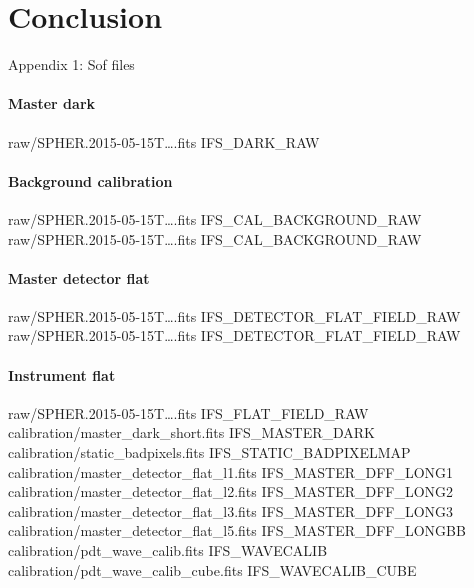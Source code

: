 \documentclass[twoside,single]{lion-msc}
\begin{document}
\chapter{Conclusion}





\clearpage
\huge{Appendix 1: Sof files}
\small
\subsubsection*{Master dark}
\begin{mdframed}[linewidth = 0.3mm, linecolor = black]
raw/SPHER.2015-05-15T\dots.fits IFS\_DARK\_RAW
\end{mdframed}

\subsubsection*{Background calibration}
\begin{mdframed}[linewidth = 0.3mm, linecolor = black]
raw/SPHER.2015-05-15T\dots.fits IFS\_CAL\_BACKGROUND\_RAW\\
raw/SPHER.2015-05-15T\dots.fits IFS\_CAL\_BACKGROUND\_RAW
\end{mdframed}

\subsubsection*{Master detector flat}
\begin{mdframed}[linewidth = 0.3mm, linecolor = black]
raw/SPHER.2015-05-15T\dots.fits IFS\_DETECTOR\_FLAT\_FIELD\_RAW\\
raw/SPHER.2015-05-15T\dots.fits IFS\_DETECTOR\_FLAT\_FIELD\_RAW
\end{mdframed}

\subsubsection*{Instrument flat}
\begin{mdframed}[linewidth = 0.3mm, linecolor = black]
raw/SPHER.2015-05-15T\dots.fits IFS\_FLAT\_FIELD\_RAW\\
calibration/master\_dark\_short.fits IFS\_MASTER\_DARK\\
calibration/static\_badpixels.fits IFS\_STATIC\_BADPIXELMAP\\
calibration/master\_detector\_flat\_l1.fits IFS\_MASTER\_DFF\_LONG1\\
calibration/master\_detector\_flat\_l2.fits IFS\_MASTER\_DFF\_LONG2\\
calibration/master\_detector\_flat\_l3.fits IFS\_MASTER\_DFF\_LONG3\\
calibration/master\_detector\_flat\_l5.fits IFS\_MASTER\_DFF\_LONGBB\\
calibration/pdt\_wave\_calib.fits IFS\_WAVECALIB\\
calibration/pdt\_wave\_calib\_cube.fits IFS\_WAVECALIB\_CUBE
\end{mdframed}
\end{document}
